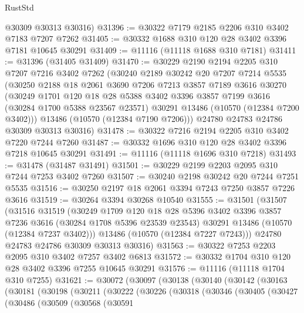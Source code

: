 \begin{lexlean}{RustStd}
\begin{coremodule}
      @30309
      @30313
      @30316)
@31396 := @30322 @7179 @2185 @2206 @310 @3402 @7183 @7207 @7262
@31405 := @30332 @1688 @310 @120 @28 @3402 @3396 @7181 @10645 @30291
@31409 := @11116 (@11118 @1688 @310 @7181)
@31411 := @31396 (@31405 @31409)
@31470 := @30229
    @2190
    @2194
    @2205
    @310
    @7207
    @7216
    @3402
    @7262
    (@30240
      @2189
      @30242
      @20
      @7207
      @7214
      @5535
      (@30250
        @2188
        @18
        @2061
        @3690
        @7206
        @7213
        @3857
        @7189
        @3616
        @30270
        (@30249
          @1701
          @120
          @18
          @28
          @5388
          @3402
          @3396
          @3857
          @7199
          @3616
          (@30284 @1700 @5388 @23567 @23571)
          @30291
          @13486
          (@10570 (@12384 @7200 @3402)))
        @13486
        (@10570 (@12384 @7190 @7206)))
      @24780
      @24783
      @24786
      @30309
      @30313
      @30316)
@31478 := @30322 @7216 @2194 @2205 @310 @3402 @7220 @7244 @7260
@31487 := @30332 @1696 @310 @120 @28 @3402 @3396 @7218 @10645 @30291
@31491 := @11116 (@11118 @1696 @310 @7218)
@31493 := @31478 (@31487 @31491)
@31501 := @30229 @2199 @2203 @2095 @310 @7244 @7253 @3402 @7260
@31507 := @30240 @2198 @30242 @20 @7244 @7251 @5535
@31516 := @30250 @2197 @18 @2061 @3394 @7243 @7250 @3857 @7226 @3616
@31519 := @30264 @3394 @30268 @10540
@31555 := @31501
    (@31507
      (@31516
        @31519
        (@30249
          @1709
          @120
          @18
          @28
          @5396
          @3402
          @3396
          @3857
          @7236
          @3616
          (@30284 @1708 @5396 @23539 @23543)
          @30291
          @13486
          (@10570 (@12384 @7237 @3402)))
        @13486
        (@10570 (@12384 @7227 @7243)))
      @24780
      @24783
      @24786
      @30309
      @30313
      @30316)
@31563 := @30322 @7253 @2203 @2095 @310 @3402 @7257 @3402 @6813
@31572 := @30332 @1704 @310 @120 @28 @3402 @3396 @7255 @10645 @30291
@31576 := @11116 (@11118 @1704 @310 @7255)
@31621 := @30072
    (@30097
      (@30138
        (@30140
          (@30142
            (@30163
              (@30181
                (@30198
                  (@30211
                    (@30222
                      (@30226
                        (@30318
                          (@30346
                            (@30405
                              (@30427
                                (@30486
                                  (@30509
                                    (@30568
                                      (@30591

\end{coremodule}
\end{lexlean}
